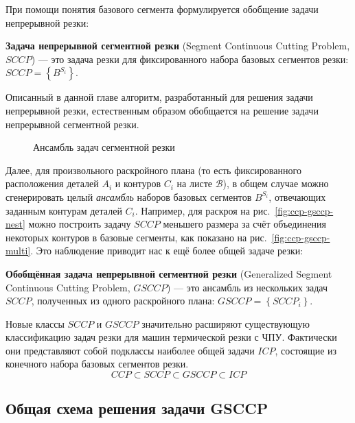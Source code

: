 При помощи понятия базового сегмента
формулируется обобщение задачи непрерывной резки:

\begin{opred}
\textbf{Задача непрерывной сегментной резки}
(Segment Continuous Cutting Problem, $SCCP$)
--- это задача резки
для фиксированного набора базовых сегментов резки:
$SCCP = \left\{B^{S_i}\right\}$.
\end{opred}

Описанный в данной главе алгоритм,
разработанный для решения задачи непрерывной резки,
естественным образом обобщается на решение
задачи непрерывной сегментной резки.

\begin{figure}
  \centering
  \caption{Ансамбль задач сегментной резки}
  \label{fig:ccp-gsccp}
\end{figure}

Далее, для произвольного раскройного плана
(то есть фиксированного расположения деталей $A_i$
и контуров $C_i$ на листе $\mathcal B$),
в общем случае можно сгенерировать целый
\textit{ансамбль}
наборов базовых сегментов $B^{S_i}$,
отвечающих заданным контурам деталей $C_i$.
Например,
для раскроя
на рис.~\ref{fig:ccp-gsccp-nest}
можно построить задачу $SCCP$
меньшего размера за счёт
объединения некоторых контуров в базовые сегменты,
как показано на рис.~\ref{fig:ccp-gsccp-multi}.
Это наблюдение приводит нас к ещё более общей задаче резки:

\begin{opred}
\textbf{Обобщённая задача непрерывной сегментной резки}
(Generalized Segment Continuous Cutting Problem, $GSCCP$)
--- это ансамбль из нескольких задач
$SCCP$,
полученных из одного раскройного плана:
$GSCCP = \left\{ SCCP_i \right\}$.
\end{opred}

Новые классы
$SCCP$ и $GSCCP$
значительно расширяют существующую классификацию
задач резки для машин термической резки с ЧПУ.
Фактически они представляют собой подклассы
наиболее общей задачи $ICP$,
состоящие из конечного набора базовых сегментов резки.
$$
CCP \subset SCCP \subset GSCCP \subset ICP
$$

\subsection{Общая схема решения задачи GSCCP}

